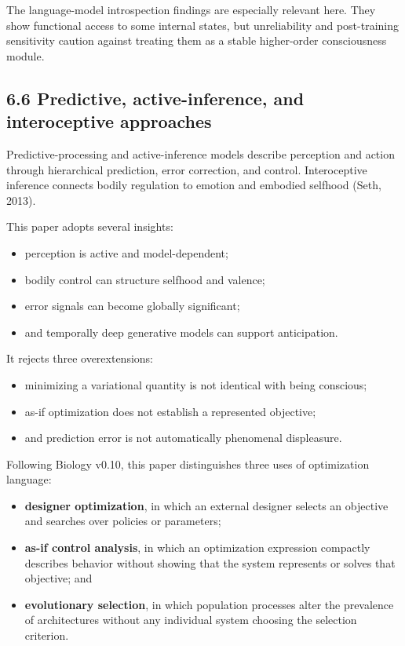 \documentclass[
  11pt,
]{article}
\providecommand{\tightlist}{%
  \setlength{\itemsep}{0pt}\setlength{\parskip}{0pt}}
\begin{document}
The language-model introspection findings are especially relevant here.
They show functional access to some internal states, but unreliability
and post-training sensitivity caution against treating them as a stable
higher-order consciousness module.

\subsection{6.6 Predictive, active-inference, and interoceptive
approaches}\label{predictive-active-inference-and-interoceptive-approaches}

Predictive-processing and active-inference models describe perception
and action through hierarchical prediction, error correction, and
control. Interoceptive inference connects bodily regulation to emotion
and embodied selfhood (Seth, 2013).

This paper adopts several insights:

\begin{itemize}
\tightlist
\item
  perception is active and model-dependent;
\item
  bodily control can structure selfhood and valence;
\item
  error signals can become globally significant;
\item
  and temporally deep generative models can support anticipation.
\end{itemize}

It rejects three overextensions:

\begin{itemize}
\tightlist
\item
  minimizing a variational quantity is not identical with being
  conscious;
\item
  as-if optimization does not establish a represented objective;
\item
  and prediction error is not automatically phenomenal displeasure.
\end{itemize}

Following Biology v0.10, this paper distinguishes three uses of
optimization language:

\begin{itemize}
\tightlist
\item
  \textbf{designer optimization}, in which an external designer selects
  an objective and searches over policies or parameters;
\item
  \textbf{as-if control analysis}, in which an optimization expression
  compactly describes behavior without showing that the system
  represents or solves that objective; and
\item
  \textbf{evolutionary selection}, in which population processes alter
  the prevalence of architectures without any individual system choosing
  the selection criterion.
\end{itemize}
\end{document}
